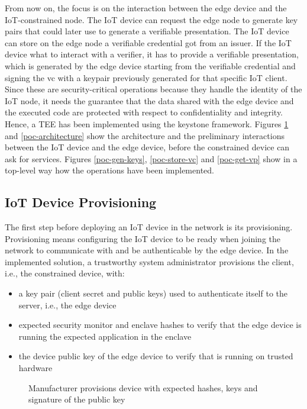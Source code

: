 From now on, the focus is on the interaction between the edge device and the IoT-constrained node. The IoT device can request the edge node to generate key pairs that could later use to generate a verifiable presentation. The IoT device can store on the edge node a verifiable credential got from an issuer. If the IoT device what to interact with a verifier, it has to provide a verifiable presentation, which is generated by the edge device starting from the verifiable credential and signing the vc with a keypair previously generated for that specific IoT client. 
Since these are security-critical operations because they handle the identity of the IoT node, it needs the guarantee that the data shared with the edge device and the executed code are protected with respect to confidentiality and integrity. Hence, a TEE has been implemented using the keystone framework.  Figures \ref{manufacturer-provisioning} and \ref{poc-architecture} show the architecture and the preliminary interactions between the IoT device and the edge device, before the constrained device can ask for services. Figures \ref{poc-gen-keys}, \ref{poc-store-vc} and \ref{poc-get-vp} show in a top-level way how the operations have been implemented. 

\subsection{IoT Device Provisioning}

The first step before deploying an IoT device in the network is its provisioning. Provisioning means configuring the IoT device to be ready when joining the network to communicate with and be authenticable by the edge device. In the implemented solution, a trustworthy system administrator provisions the client, i.e., the constrained device, with: 
\begin{itemize}
    \item a key pair (client secret and public keys) used to authenticate itself to the server, i.e., the edge device
    \item expected security monitor and enclave hashes to verify that the edge device is running the expected application in the enclave 
    \item the device public key of the edge device to verify that is running on trusted hardware
\end{itemize} 

\begin{figure}[!h]
    \centering
    
    \caption{Manufacturer provisions device with expected hashes, keys and signature of the public key}
    \label{manufacturer-provisioning}
\end{figure}

